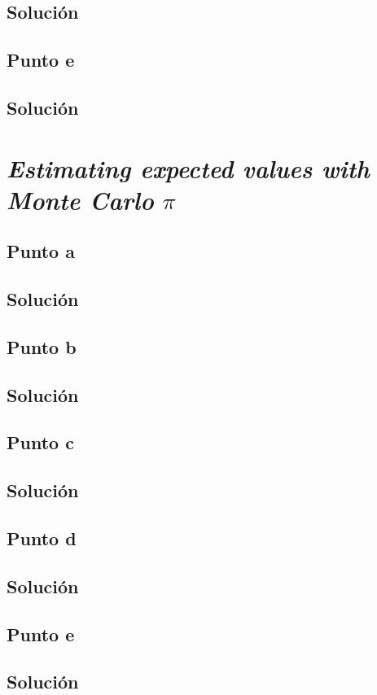 \documentclass[12pt]{article}
\begin{document}
\subsection{Solución}

\subsection{Punto e}
\subsection{Solución}



\section{\textit{Estimating expected values with Monte Carlo} \(\pi\)}

\subsection{Punto a}
\subsection{Solución}

\subsection{Punto b}
\subsection{Solución}

\subsection{Punto c}
\subsection{Solución}

\subsection{Punto d}
\subsection{Solución}

\subsection{Punto e}
\subsection{Solución}
\end{document}
